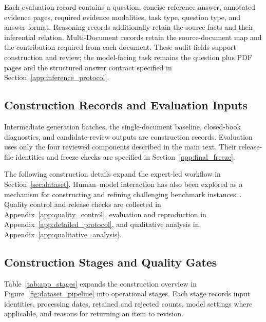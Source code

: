 \documentclass{article} %
\begin{document}
Each evaluation record contains a question, concise reference answer,  annotated evidence pages, required evidence modalities, task type, question type, and answer format. Reasoning records additionally retain the source facts and their inferential relation. Multi-Document records retain the source-document map and the contribution required from each document. These audit fields support construction and review; the model-facing task remains the question plus PDF pages and the structured answer contract specified in Section~\ref{app:inference_protocol}.

\subsection{Construction Records and Evaluation Inputs}
\label{app:construction_records}

Intermediate generation batches, the single-document baseline, closed-book diagnostics, and candidate-review outputs are construction records. Evaluation uses only the four reviewed components described in the main text. Their release-file identities and freeze checks are specified in Section~\ref{app:final_freeze}.
\FloatBarrier

\begingroup
\raggedbottom

The following construction details expand the expert-led workflow in Section~\ref{sec:dataset}. Human--model interaction has also been explored as a mechanism for constructing
and refining challenging benchmark instances~\cite{kiela2021dynabench}. Quality control and release checks are collected in Appendix~\ref{app:quality_control}, evaluation and reproduction in Appendix~\ref{app:detailed_protocol}, and qualitative analysis in Appendix~\ref{app:qualitative_analysis}.

\subsection{Construction Stages and Quality Gates}
\label{app:construction_pipeline}

Table~\ref{tab:app_stages} expands the construction overview in Figure~\ref{fig:dataset_pipeline} into operational stages. Each stage records input identities, processing dates, retained and rejected counts, model settings where applicable, and reasons for returning an item to revision.
\end{document}
